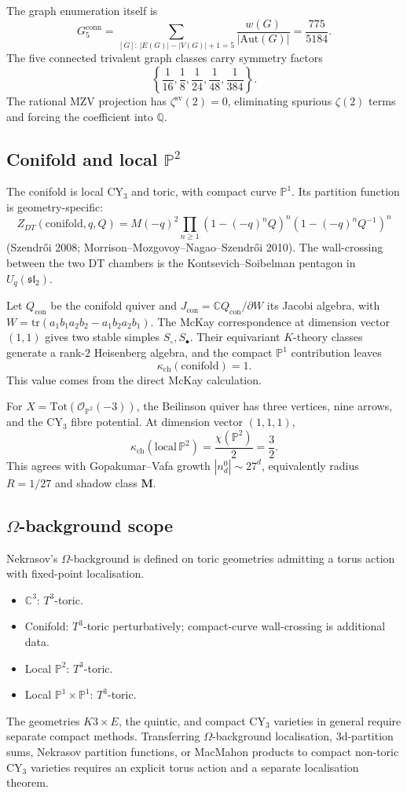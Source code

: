 The graph enumeration itself is
\[
G_5^{\mathrm{conn}}
=\sum_{[G]:\,|E(G)|-|V(G)|+1=5}
\frac{w(G)}{|\mathrm{Aut}(G)|}
=\frac{775}{5184}.
\]
The five connected trivalent graph classes carry symmetry factors
\[
\left\{\frac1{16},\frac18,\frac1{24},\frac1{48},\frac1{384}\right\}.
\]
The rational MZV projection has
$\zeta^{\mathrm{sv}}(2)=0$, eliminating spurious $\zeta(2)$ terms and
forcing the coefficient into $\mathbb Q$.

\subsection*{Conifold and local $\mathbb P^2$}

The conifold is local CY$_3$ and toric, with compact curve
$\mathbb P^1$. Its partition function is geometry-specific:
\[
Z_{DT}(\mathrm{conifold},q,Q)=
M(-q)^2\prod_{n\ge1}(1-(-q)^nQ)^n(1-(-q)^nQ^{-1})^n
\]
(Szendrői 2008; Morrison--Mozgovoy--Nagao--Szendrői 2010). The
wall-crossing between the two DT chambers is the Kontsevich--Soibelman
pentagon in $U_q(\mathfrak{sl}_2)$.

Let $Q_{\mathrm{con}}$ be the conifold quiver and
$J_{\mathrm{con}}=\mathbb CQ_{\mathrm{con}}/\partial W$ its Jacobi
algebra, with
$W=\mathrm{tr}(a_1b_1a_2b_2-a_1b_2a_2b_1)$. The McKay correspondence at
dimension vector $(1,1)$ gives two stable simples
$S_\circ,S_\bullet$. Their equivariant $K$-theory classes generate a
rank-$2$ Heisenberg algebra, and the compact $\mathbb P^1$ contribution
leaves
\[
\kappa_{\mathrm{ch}}(\mathrm{conifold})=1.
\]
This value comes from the direct McKay calculation.

For $X=\mathrm{Tot}(\mathcal O_{\mathbb P^2}(-3))$, the Beilinson
quiver has three vertices, nine arrows, and the CY$_3$ fibre potential.
At dimension vector $(1,1,1)$,
\[
\kappa_{\mathrm{ch}}(\mathrm{local}\,\mathbb P^2)
  =\frac{\chi(\mathbb P^2)}{2}
  =\frac32.
\]
This agrees with Gopakumar--Vafa growth
$|n^0_d|\sim27^d$, equivalently radius $R=1/27$ and shadow class
$\mathbf M$.

\subsection*{$\Omega$-background scope}

Nekrasov's $\Omega$-background is defined on toric geometries admitting
a torus action with fixed-point localisation.
\begin{itemize}
\item $\mathbb C^3$: $T^3$-toric.
\item Conifold: $T^3$-toric perturbatively; compact-curve
    wall-crossing is additional data.
\item Local $\mathbb P^2$: $T^3$-toric.
\item Local $\mathbb P^1\times\mathbb P^1$: $T^3$-toric.
\end{itemize}
The geometries $K3\times E$, the quintic, and compact CY$_3$ varieties
in general require separate compact methods. Transferring
$\Omega$-background localisation, 3d-partition sums, Nekrasov partition
functions, or MacMahon products to compact non-toric CY$_3$ varieties
requires an explicit torus action and a separate localisation theorem.

